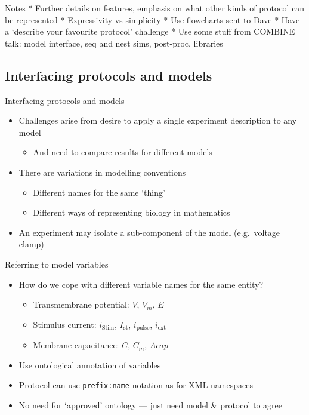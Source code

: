 \documentclass[t,xcolor={usenames,dvipsnames}]{beamer}
\newcommand{\subitem}[1]{\begin{itemize}[<.->]\item #1 \end{itemize}}
\begin{document}
\begin{frame}{Notes}
 * Further details on features, emphasis on what other kinds of protocol can be represented
 * Expressivity vs simplicity
 * Use flowcharts sent to Dave
 * Have a `describe your favourite protocol' challenge
 * Use some stuff from COMBINE talk: model interface, seq and nest sims, post-proc, libraries
\end{frame}

\subsection{Interfacing protocols and models}

\begin{frame}{Interfacing protocols and models}
\begin{itemize}
\item Challenges arise from desire to apply a single experiment description to any model
  \subitem{And need to compare results for different models}
\item There are variations in modelling conventions
  \begin{itemize}
  \item Different names for the same `thing'
  \item Different ways of representing biology in mathematics
  \end{itemize}
\item An experiment may isolate a sub-component of the model (e.g.\ voltage clamp)
\end{itemize}
\end{frame}

\begin{frame}{Referring to model variables}
\begin{itemize}
\item How do we cope with different variable names for the same entity?
  \begin{itemize}
  \item Transmembrane potential: $V$, $V_m$, $E$
  \item Stimulus current: $i_{\mathrm{Stim}}$, $I_{\mathrm{st}}$, $i_{\mathrm{pulse}}$, $i_{\mathrm{ext}}$
  \item Membrane capacitance: $C$, $C_m$, $\mathit{Acap}$
  \end{itemize}
\item Use \alert{ontological annotation} of variables
\item Protocol can use \texttt{prefix:name} notation as for XML namespaces
\item No need for `approved' ontology --- just need model \& protocol to agree
\end{itemize}
\end{frame}
\end{document}
